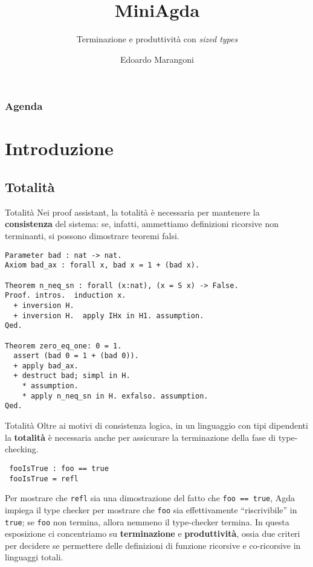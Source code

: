 \documentclass[t,aspectratio=169,9pt]{beamer}
\title{MiniAgda}
\subtitle{Terminazione e produttività con \textit{sized types}}
\date{}
\author{Edoardo Marangoni}
\begin{document}
\frame[plain]{\titlepage}

\begin{frame}[t,plain]
	\frametitle{Agenda}
	\tableofcontents
\end{frame}


\section[intro]{Introduzione}
\subsection[totalità]{Totalità}
\begin{frame}[fragile]{Totalità}
	Nei proof assistant, la totalità è necessaria per mantenere la
	\textbf{consistenza} del sistema: se, infatti, ammettiamo definizioni ricorsive
	non terminanti, si possono dimostrare teoremi falsi.
	\vfill
\begin{verbatim}
Parameter bad : nat -> nat.
Axiom bad_ax : forall x, bad x = 1 + (bad x).

Theorem n_neq_sn : forall (x:nat), (x = S x) -> False.
Proof. intros.  induction x.
  + inversion H.
  + inversion H.  apply IHx in H1. assumption.
Qed.

Theorem zero_eq_one: 0 = 1.
  assert (bad 0 = 1 + (bad 0)).
  + apply bad_ax.
  + destruct bad; simpl in H.
    * assumption.
    * apply n_neq_sn in H. exfalso. assumption.
Qed.
\end{verbatim}
\end{frame}

\begin{frame}[fragile]{Totalità}
	Oltre ai motivi di consistenza logica, in un linguaggio con tipi dipendenti la
		{\bf totalità} è necessaria anche per assicurare la terminazione della fase di
	type-checking.

	\begin{verbatim}
 fooIsTrue : foo == true
 fooIsTrue = refl
\end{verbatim}

	Per mostrare che \texttt{refl} sia una dimostrazione del fatto che \texttt{foo
		== true}, Agda impiega il type checker per mostrare che \texttt{foo} sia
	effettivamente ``riscrivibile'' in \texttt{true}; se \texttt{foo} non termina,
	allora nemmeno il type-checker termina. In questa esposizione ci concentriamo su
		{\bf terminazione} e {\bf produttività}, ossia due criteri per decidere se
	permettere delle definizioni di funzione ricorsive e co-ricorsive in linguaggi
	totali.
\end{frame}
\end{document}
